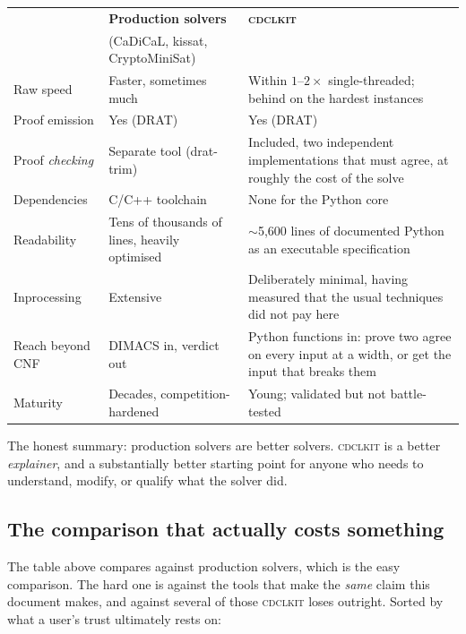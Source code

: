 \documentclass[11pt,a4paper]{article}
\newcommand{\cdclkit}{\textsc{cdclkit}}
\begin{document}
\begin{longtable}{p{4.1cm}p{4.6cm}p{5.4cm}}
\toprule
& \textbf{Production solvers} & \textbf{\cdclkit{}} \\
& (CaDiCaL, kissat, CryptoMiniSat) & \\
\midrule
\endhead
Raw speed & Faster, sometimes much & Within $1$--$2\times$ single-threaded;
  behind on the hardest instances \\
Proof emission & Yes (DRAT) & Yes (DRAT) \\
Proof \emph{checking} & Separate tool (drat-trim) & Included, two independent
  implementations that must agree, at roughly the cost of the solve \\
Dependencies & C/C++ toolchain & None for the Python core \\
Readability & Tens of thousands of lines, heavily optimised & $\sim$5{,}600
  lines of documented Python as an executable specification \\
Inprocessing & Extensive & Deliberately minimal, having measured that the
  usual techniques did not pay here \\
Reach beyond CNF & DIMACS in, verdict out & Python functions in: prove two
  agree on every input at a width, or get the input that breaks them \\
Maturity & Decades, competition-hardened & Young; validated but not
  battle-tested \\
\bottomrule
\end{longtable}

\noindent
The honest summary: production solvers are better solvers. \cdclkit{} is a better
\emph{explainer}, and a substantially better starting point for anyone who
needs to understand, modify, or qualify what the solver did.

\subsection*{The comparison that actually costs something}
\label{sec:verified}

The table above compares against production solvers, which is the easy
comparison. The hard one is against the tools that make the \emph{same} claim
this document makes, and against several of those \cdclkit{} loses outright.
Sorted by what a user's trust ultimately rests on:
\end{document}
